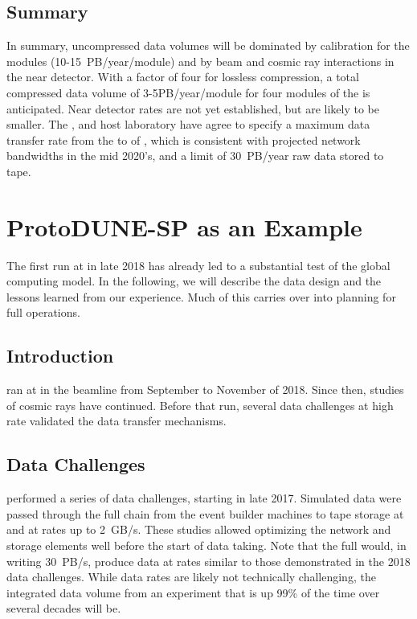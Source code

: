 \subsection{Summary}
In summary, uncompressed data volumes will be dominated by calibration for the  modules (10-15~PB/year/module) and by beam and cosmic ray interactions in the near detector.  With a  factor of four for lossless compression, a total compressed data volume of 3-5PB/year/module for four modules of the  is anticipated. Near detector rates are not yet established, but are likely to be smaller.   
The ,     and host laboratory %
have agree to specify  a  maximum data transfer rate from the  to  of \surffnalbw, which is consistent with projected network bandwidths in the mid 2020's, and a limit of \SI{30}{PB/year} raw data stored to tape. 


\section{ProtoDUNE-SP as an Example}
\label{ch:exec-comp-proto-SP}
The first   run at  in late 2018 has already led to a %
substantial test of the global computing model.  In the following, we will describe the  data design and the lessons learned from our experience. Much of this carries over into planning for full  operations. 

\subsection{Introduction}


 ran at  in the  beamline from September to November of 2018. Since then, studies of cosmic rays have continued. Before that run, several data challenges at high rate validated the data transfer mechanisms. 

\subsection{Data Challenges}

 performed a series of data challenges, starting in late 2017.  Simulated data were passed through the full chain from the event builder machines to tape storage at  and  at rates up to \SI{2}{GB/s}.  These studies allowed optimizing the network and storage elements well before the start of data taking.
Note that the full   would, in writing \SI{30}{PB/s}, produce data at rates similar to  those demonstrated in the 2018 data challenges. While data rates are likely not technically challenging, the integrated data volume from an experiment that is up 99\% of the time over several decades will be. 

